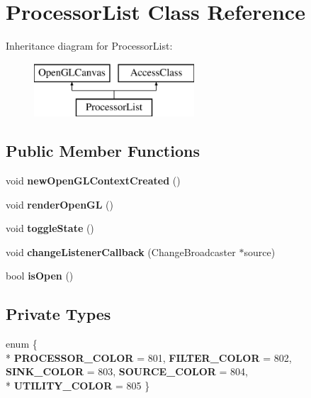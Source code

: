 \hypertarget{classProcessorList}{\section{Processor\-List Class Reference}
\label{classProcessorList}
}
Inheritance diagram for Processor\-List\-:\begin{figure}[H]
\begin{center}
\leavevmode
\includegraphics[height=2.000000cm]{classProcessorList}
\end{center}
\end{figure}
\subsection*{Public Member Functions}
\begin{DoxyCompactItemize}
\item 
\hypertarget{classProcessorList_a5ca8297372a8275310b49fab3dc19e87}{void {\bfseries new\-Open\-G\-L\-Context\-Created} ()}\label{classProcessorList_a5ca8297372a8275310b49fab3dc19e87}

\item 
\hypertarget{classProcessorList_affadd35d149f91d659285b2c6481cde6}{void {\bfseries render\-Open\-G\-L} ()}\label{classProcessorList_affadd35d149f91d659285b2c6481cde6}

\item 
\hypertarget{classProcessorList_ae764e342d076a7bc3a3d91b9158b2e79}{void {\bfseries toggle\-State} ()}\label{classProcessorList_ae764e342d076a7bc3a3d91b9158b2e79}

\item 
\hypertarget{classProcessorList_abf7f1a03787844bbbe4866ebe1d858c5}{void {\bfseries change\-Listener\-Callback} (Change\-Broadcaster $\ast$source)}\label{classProcessorList_abf7f1a03787844bbbe4866ebe1d858c5}

\item 
\hypertarget{classProcessorList_ac02cb5b4e006b02e60e37c9f25bdf668}{bool {\bfseries is\-Open} ()}\label{classProcessorList_ac02cb5b4e006b02e60e37c9f25bdf668}

\end{DoxyCompactItemize}
\subsection*{Private Types}
\begin{DoxyCompactItemize}
\item 
enum \{ \\*
{\bfseries P\-R\-O\-C\-E\-S\-S\-O\-R\-\_\-\-C\-O\-L\-O\-R} =  801, 
{\bfseries F\-I\-L\-T\-E\-R\-\_\-\-C\-O\-L\-O\-R} =  802, 
{\bfseries S\-I\-N\-K\-\_\-\-C\-O\-L\-O\-R} =  803, 
{\bfseries S\-O\-U\-R\-C\-E\-\_\-\-C\-O\-L\-O\-R} =  804, 
\\*
{\bfseries U\-T\-I\-L\-I\-T\-Y\-\_\-\-C\-O\-L\-O\-R} =  805
 \}
\end{DoxyCompactItemize}
